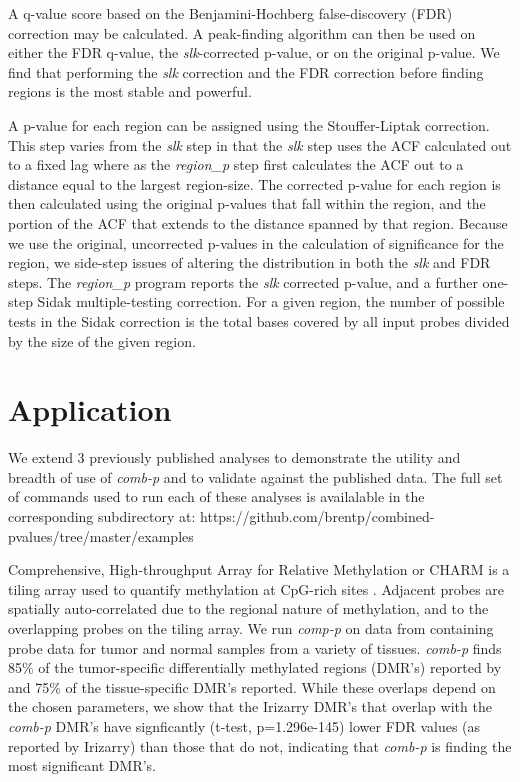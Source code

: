 \documentclass{bioinfo}
\begin{document}
\begin{methods}
A q-value score based on the Benjamini-Hochberg false-discovery (FDR) correction
 may be calculated. A peak-finding algorithm can then be used on either the FDR
q-value, the \textit{slk}-corrected p-value, or on the original p-value.
We find that performing the \textit{slk} correction and the FDR correction
before finding regions is the most stable and powerful.

A p-value for each region can be assigned using the Stouffer-Liptak correction.
This step varies from the \textit{slk} step in that the \textit{slk} step uses
the ACF calculated out to a fixed lag where as the \textit{region\_p} step first
calculates the ACF out to a distance equal to the largest region-size. The
corrected p-value for each region is then calculated using the original p-values that
fall within the region, and the portion of the ACF that extends to the distance
spanned by that region. Because we use the original, uncorrected p-values in the
calculation of significance for the region, we side-step issues of altering the
distribution in both the \textit{slk} and FDR steps. The \textit{region\_p}
program reports the \textit{slk} corrected p-value, and a further one-step
Sidak \citep{Sidak}
multiple-testing correction. For a given region, the number of possible
tests in the Sidak correction is the total bases covered by all input
probes divided by the size of the given region.

\section{Application}
We extend 3 previously published analyses to demonstrate the utility and
breadth of use of \textit{comb-p} and to validate against the
published data. The full set of commands used to run each of these analyses
is availalable in the corresponding subdirectory at:
https://github.com/brentp/combined-pvalues/tree/master/examples

Comprehensive, High-throughput Array for Relative Methylation or CHARM is a
tiling array used to quantify methylation at CpG-rich sites \citep{Irizarry2008}.
Adjacent probes are spatially auto-correlated due to the regional nature of
methylation, and to the overlapping probes on the tiling array.
We run \textit{comp-p} on data from
\citealp{Irizarry2009} containing probe data for tumor and normal samples from
a variety of tissues. \textit{comb-p} finds 85\% of the
tumor-specific differentially methylated regions (DMR's) reported by
\citealp{Irizarry2009} and 75\% of the tissue-specific DMR's reported.
While these overlaps depend on the chosen parameters, we show that the Irizarry
DMR's that overlap with the \textit{comb-p} DMR's have signficantly (t-test,
p=1.296e-145) lower FDR values (as reported by Irizarry) than those that do not,
indicating that \textit{comb-p} is finding the most significant DMR's.


\end{methods}
\end{document}
